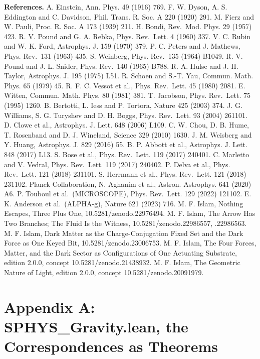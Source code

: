 \documentclass[10pt]{article}
\begin{document}
\textbf{References.} A. Einstein, Ann. Phys. 49 (1916) 769. F. W. Dyson,
A. S. Eddington and C. Davidson, Phil. Trans. R. Soc. A 220 (1920) 291.
M. Fierz and W. Pauli, Proc. R. Soc. A 173 (1939) 211. H. Bondi,
Rev.~Mod. Phys. 29 (1957) 423. R. V. Pound and G. A. Rebka, Phys.
Rev.~Lett. 4 (1960) 337. V. C. Rubin and W. K. Ford, Astrophys. J. 159
(1970) 379. P. C. Peters and J. Mathews, Phys. Rev.~131 (1963) 435. S.
Weinberg, Phys. Rev.~135 (1964) B1049. R. V. Pound and J. L. Snider,
Phys. Rev.~140 (1965) B788. R. A. Hulse and J. H. Taylor, Astrophys. J.
195 (1975) L51. R. Schoen and S.-T. Yau, Commun. Math. Phys. 65 (1979)
45. R. F. C. Vessot et al., Phys. Rev.~Lett. 45 (1980) 2081. E. Witten,
Commun. Math. Phys. 80 (1981) 381. T. Jacobson, Phys. Rev.~Lett. 75
(1995) 1260. B. Bertotti, L. Iess and P. Tortora, Nature 425 (2003) 374.
J. G. Williams, S. G. Turyshev and D. H. Boggs, Phys. Rev.~Lett. 93
(2004) 261101. D. Clowe et al., Astrophys. J. Lett. 648 (2006) L109. C.
W. Chou, D. B. Hume, T. Rosenband and D. J. Wineland, Science 329 (2010)
1630. J. M. Weisberg and Y. Huang, Astrophys. J. 829 (2016) 55. B. P.
Abbott et al., Astrophys. J. Lett. 848 (2017) L13. S. Bose et al., Phys.
Rev.~Lett. 119 (2017) 240401. C. Marletto and V. Vedral, Phys.
Rev.~Lett. 119 (2017) 240402. P. Delva et al., Phys. Rev.~Lett. 121
(2018) 231101. S. Herrmann et al., Phys. Rev.~Lett. 121 (2018) 231102.
Planck Collaboration, N. Aghanim et al., Astron. Astrophys. 641 (2020)
A6. P. Touboul et al.~(MICROSCOPE), Phys. Rev.~Lett. 129 (2022) 121102.
E. K. Anderson et al.~(ALPHA-g), Nature 621 (2023) 716. M. F. Islam,
Nothing Escapes, Three Plus One, 10.5281/\allowbreak{}zenodo.22976494.
M. F. Islam, The Arrow Has Two Branches; The Fluid Is the Witness,
10.5281/\allowbreak{}zenodo.22986557, .22986563. M. F. Islam, Dark
Matter as the Charge-Conjugation Fixed Set and the Dark Force as One
Keyed Bit, 10.5281/\allowbreak{}zenodo.23006753. M. F. Islam, The Four
Forces, Matter, and the Dark Sector as Configurations of One Actuating
Substrate, edition 2.0.0, concept 10.5281/\allowbreak{}zenodo.21438932.
M. F. Islam, The Geometric Nature of Light, edition 2.0.0, concept
10.5281/\allowbreak{}zenodo.20091979.

\hypertarget{appendix-a-sphys_gravity.lean-the-correspondences-as-theorems}{%
\section{Appendix A: SPHYS\_Gravity.lean, the Correspondences as
Theorems}\label{appendix-a-sphys_gravity.lean-the-correspondences-as-theorems}}
\end{document}
